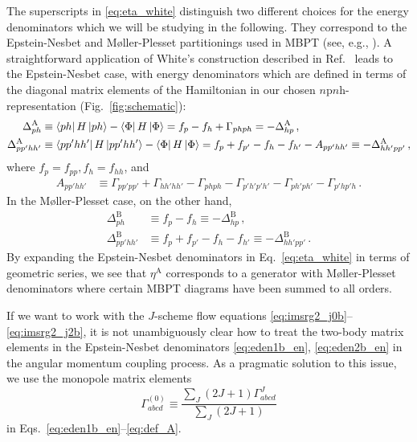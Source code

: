 The superscripts in \eqref{eq:eta_white} distinguish two different choices for the energy denominators which we will be studying in the following. They correspond to the Epstein-Nesbet and M{\o}ller-Plesset partitionings used in MBPT (see, e.g., \cite{Shavitt:2009}). A straightforward application of White's construction described in Ref.~\cite{White:2002fk} leads to the Epstein-Nesbet case, with energy denominators which are defined in terms of the diagonal matrix elements of the Hamiltonian in our chosen $n$p$n$h-representation (Fig.~\ref{fig:schematic}):
\begin{align}
  \Delta^\text{A}_{ph} &\equiv \matrixe{ph}{\HO}{ph} - \matrixe{\Phi}{\HO}{\Phi}
                  = f_p - f_h + \Gamma_{phph} = - \Delta^\text{A}_{hp} \,,\label{eq:eden1b_en}\\  
  \Delta^\text{A}_{pp'hh'} &\equiv \matrixe{pp'hh'}{\HO}{pp'hh'} - \matrixe{\Phi}{\HO}{\Phi}
                  = f_p + f_{p'} - f_h - f_{h'} - A_{pp'hh'} \equiv - \Delta^\text{A}_{hh'pp'} \,,\label{eq:eden2b_en}
\end{align}
where $f_{p}=f_{pp}, f_{h}=f_{hh}$, and
\begin{align}
  A_{pp'hh'}&\equiv\Gamma_{pp'pp'}+\Gamma_{hh'hh'}-\Gamma_{phph}
       -\Gamma_{p'h'p'h'}-\Gamma_{ph'ph'}-\Gamma_{p'hp'h}\,.\label{eq:def_A}
\end{align}
In the M{\o}ller-Plesset case, on the other hand, 
\begin{align}
  \Delta^\text{B}_{ph}     &\equiv f_p - f_h \equiv - \Delta^\text{B}_{hp} \,, \label{eq:eden1b_mp}\\  
  \Delta^\text{B}_{pp'hh'} &\equiv f_p + f_{p'} - f_h - f_{h'} \equiv - \Delta^\text{B}_{hh'pp'}\,.\label{eq:eden2b_mp}
\end{align}
By expanding the Epstein-Nesbet denominators in Eq.~\eqref{eq:eta_white} in terms of geometric series, we see that $\eta^\text{A}$ corresponds to a generator with M{\o}ller-Plesset denominators where certain MBPT diagrams have been summed to all orders.

If we want to work with the $J$-scheme flow equations \eqref{eq:imsrg2_j0b}--\eqref{eq:imsrg2_j2b}, it is not unambiguously clear how to treat the two-body matrix elements in the Epstein-Nesbet denominators \eqref{eq:eden1b_en}, \eqref{eq:eden2b_en} in the angular momentum coupling process. As a pragmatic solution to this issue, we use the monopole matrix elements
\begin{equation}
  \Gamma^{(0)}_{abcd}\equiv\frac{\sum_J(2J+1)\Gamma^J_{abcd}}{\sum_{J}(2J+1)}
\end{equation}
in Eqs.~\eqref{eq:eden1b_en}--\eqref{eq:def_A}. 

